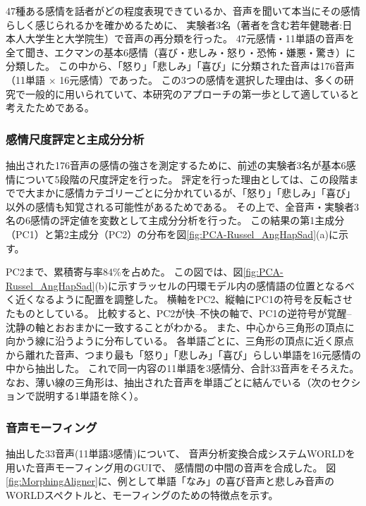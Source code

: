 47種ある感情を話者がどの程度表現できているか、音声を聞いて本当にその感情らしく感じられるかを確かめるために、
実験者3名（著者を含む若年健聴者:日本人大学生と大学院生）で音声の再分類を行った。
47元感情・11単語の音声を全て聞き、エクマンの基本6感情（喜び・悲しみ・怒り・恐怖・嫌悪・驚き）\cite{ekman1992argument}に分類した。
この中から、「怒り」「悲しみ」「喜び」に分類された音声は176音声（11単語 $\times$ 16元感情）であった。
この3つの感情を選択した理由は、多くの研究で一般的に用いられていて、本研究のアプローチの第一歩として適していると考えたためである。

\newpage


\subsubsection{感情尺度評定と主成分分析}
抽出された176音声の感情の強さを測定するために、前述の実験者3名が基本6感情について5段階の尺度評定を行った。
評定を行った理由としては、この段階までで大まかに感情カテゴリーごとに分かれているが、「怒り」「悲しみ」「喜び」以外の感情も知覚される可能性があるためである。
その上で、全音声・実験者3名の6感情の評定値を変数として主成分分析を行った。
この結果の第1主成分（PC1）と第2主成分（PC2）の分布を図\ref{fig:PCA-Russel_AngHapSad}(a)に示す。

PC2まで、累積寄与率84\%を占めた。
この図では、図\ref{fig:PCA-Russel_AngHapSad}(b)に示すラッセルの円環モデル\cite{russell1980circumplex}内の感情語の位置となるべく近くなるように配置を調整した。
横軸をPC2、縦軸にPC1の符号を反転させたものとしている。
比較すると、PC2が快--不快の軸で、PC1の逆符号が覚醒--沈静の軸とおおまかに一致することがわかる。
また、中心から三角形の頂点に向かう線に沿うように分布している。
各単語ごとに、三角形の頂点に近く原点から離れた音声、つまり最も「怒り」「悲しみ」「喜び」らしい単語を16元感情の中から抽出した。
これで同一内容の11単語を3感情分、合計33音声をそろえた。
なお、薄い線の三角形は、抽出された音声を単語ごとに結んでいる（次のセクションで説明する1単語を除く）。





\subsubsection{音声モーフィング}

抽出した33音声(11単語\time 3感情)について、
音声分析変換合成システムWORLD\cite{morise2016world}を用いた音声モーフィング用のGUI\cite{kawahara2024interactive}で、
感情間の中間の音声を合成した。
図\ref{fig:MorphingAligner}に、例として単語「なみ」の喜び音声と悲しみ音声のWORLDスペクトルと、モーフィングのための特徴点を示す。

